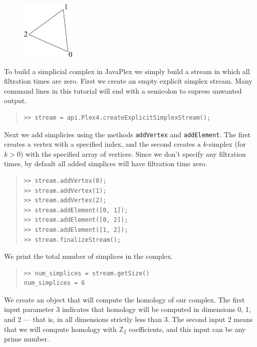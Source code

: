 \documentclass[amscd, amssymb, verbatim]{amsart}[12pt]
\theoremstyle{remark}
\theoremstyle{remark}
\theoremstyle{remark}
\begin{document}
\begin{figure}[htp]
  	\begin{center}
    	\includegraphics[width=1in]{s1.pdf}
   	\end{center}
\end{figure}
\FloatBarrier

To build a simplicial complex in JavaPlex we simply build a stream in which all filtration times are zero. First we create an empty explicit simplex stream. Many command lines in this tutorial will end with a semicolon to supress unwanted output.

\begin{quote} \begin{verbatim} 
>> stream = api.Plex4.createExplicitSimplexStream();
\end{verbatim} \end{quote}

Next we add simplicies using the methods \texttt{addVertex} and \texttt{addElement}. The first creates a vertex with a specified index, and the second creates a $k$-simplex (for $k >0$) with the specified array of vertices. Since we don't specify any filtration times, by default all added simplices will have filtration time zero.

\begin{quote} \begin{verbatim}
>> stream.addVertex(0);
>> stream.addVertex(1);
>> stream.addVertex(2);
>> stream.addElement([0, 1]);
>> stream.addElement([0, 2]);
>> stream.addElement([1, 2]);
>> stream.finalizeStream();
\end{verbatim} \end{quote}

We print the total number of simplices in the complex.

\begin{quote} \begin{verbatim}
>> num_simplices = stream.getSize()
num_simplices = 6
\end{verbatim} \end{quote}

We create an object that will compute the homology of our complex. The first input parameter 3 indicates that homology will be computed in dimensions 0, 1, and 2 --- that is, in all dimensions strictly less than 3. The second input 2 means that we will compute homology with $\mathbb{Z}_2$ coefficients, and this input can be any prime number.
\end{document}
